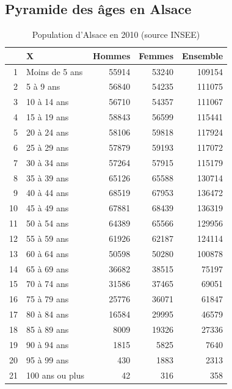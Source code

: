 \documentclass[12pt,english,french,twoside]{book}\usepackage[]{graphicx}\usepackage[]{color}
\begin{document}

\subsection*{Pyramide des âges en Alsace}


\begin{table}[ht]
\centering
\begin{tabular}{rlrrr}
  \hline
 & X & Hommes & Femmes & Ensemble \\ 
  \hline
1 & Moins de 5 ans & 55914 & 53240 & 109154 \\ 
  2 & 5 à 9 ans & 56840 & 54235 & 111075 \\ 
  3 & 10 à 14 ans & 56710 & 54357 & 111067 \\ 
  4 & 15 à 19 ans & 58843 & 56599 & 115441 \\ 
  5 & 20 à 24 ans & 58106 & 59818 & 117924 \\ 
  6 & 25 à 29 ans & 57879 & 59193 & 117072 \\ 
  7 & 30 à 34 ans & 57264 & 57915 & 115179 \\ 
  8 & 35 à 39 ans & 65126 & 65588 & 130714 \\ 
  9 & 40 à 44 ans & 68519 & 67953 & 136472 \\ 
  10 & 45 à 49 ans & 67881 & 68439 & 136319 \\ 
  11 & 50 à 54 ans & 64389 & 65566 & 129956 \\ 
  12 & 55 à 59 ans & 61926 & 62187 & 124114 \\ 
  13 & 60 à 64 ans & 50598 & 50280 & 100878 \\ 
  14 & 65 à 69 ans & 36682 & 38515 & 75197 \\ 
  15 & 70 à 74 ans & 31586 & 37465 & 69051 \\ 
  16 & 75 à 79 ans & 25776 & 36071 & 61847 \\ 
  17 & 80 à 84 ans & 16584 & 29995 & 46579 \\ 
  18 & 85 à 89 ans & 8009 & 19326 & 27336 \\ 
  19 & 90 à 94 ans & 1815 & 5825 & 7640 \\ 
  20 & 95 à 99 ans & 430 & 1883 & 2313 \\ 
  21 & 100 ans ou plus &  42 & 316 & 358 \\ 
   \hline
\end{tabular}
\caption[Population d'Alsace en 2010]{Population d'Alsace en 2010 (source INSEE)} 
\label{tab:pop_insee}
\end{table}
\end{document}
